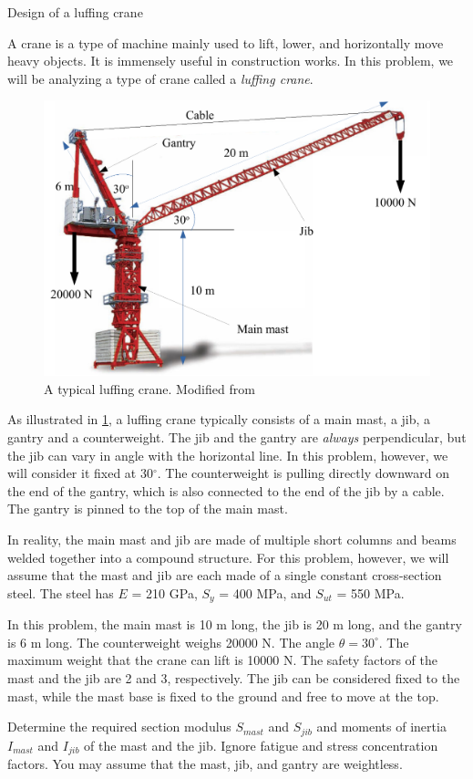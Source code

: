 \documentclass[
10pt,
a4paper,
openany,
svgnames,
]{book}
\begin{document}
\begin{example} Design of a luffing crane
  
  A crane is a type of machine mainly used to lift, lower, and horizontally move heavy objects. It is immensely useful in construction works. In this problem, we will be analyzing a type of crane called a \emph{luffing crane}.
  
  \begin{figure}[H]
    \centering
    \includegraphics[scale=0.6]{pictures/Simple-load-bearing/tower-crane2}
    \caption{A typical luffing crane. Modified from \cite{monokloncrane}}
    \label{tower crane}
  \end{figure}
  
  As illustrated in \cref{tower crane}, a luffing crane typically consists of a main mast, a jib, a gantry and a counterweight. The jib and the gantry are \emph{always} perpendicular, but the jib can vary in angle with the horizontal line. In this problem, however, we will consider it fixed at 30$^{\circ}$. The counterweight is pulling directly downward on the end of the gantry, which is also connected to the end of the jib by a cable. The gantry is pinned to the top of the main mast.
  
  In reality, the main mast and jib are made of multiple short columns and beams welded together into a compound structure. For this problem, however, we will assume that the mast and jib are each made of a single constant cross-section steel. The steel has $E$ = 210 GPa, $S_y$ = 400 MPa, and $S_{ut}$ = 550 MPa.
  
  In this problem, the main mast is 10 m long, the jib is 20 m long, and the gantry is 6 m long. The counterweight weighs 20000 N. The angle $\theta = 30^{\circ}$. The maximum weight that the crane can lift is 10000 N. The safety factors of the mast and the jib are 2 and 3, respectively. The jib can be considered fixed to the mast, while the mast base is fixed to the ground and free to move at the top.
  
  Determine the required section modulus $S_{mast}$ and $S_{jib}$ and moments of inertia $I_{mast}$ and $I_{jib}$ of the mast and the jib. Ignore fatigue and stress concentration factors. You may assume that the mast, jib, and gantry are weightless.
  
\end{example}
\end{document}
